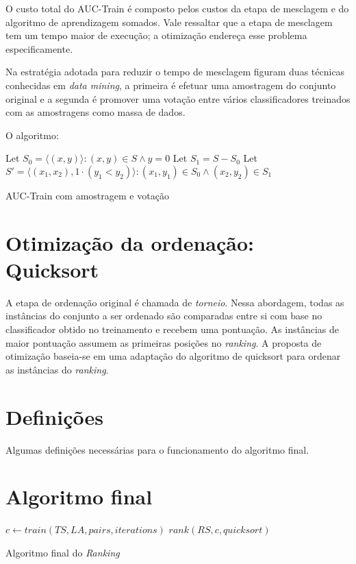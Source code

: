 O custo total do AUC-Train é composto pelos custos da etapa de mesclagem e do algoritmo de aprendizagem somados. Vale ressaltar que a etapa de mesclagem tem um tempo maior de execução; a otimização endereça esse problema especificamente.

Na estratégia adotada para reduzir o tempo de mesclagem figuram duas técnicas conhecidas em \emph{data mining}, a primeira é efetuar uma amostragem do conjunto original e a segunda é promover uma votação entre vários classificadores treinados com as amostragens como massa de dados.

O algoritmo:

\begin{algorithm}
\begin{algorithmic}

\STATE Let $S_0 = {\langle (x, y) \rangle: (x, y) \in S \wedge y = 0}$
\STATE Let $S_1 = S - S_0$
\STATE Let $S' = {{\langle (x_1, x_2), 1 \cdot (y_1 < y_2) \rangle : (x_1, y_1) \in S_0 \wedge (x_2, y_2) \in S_1}}$
\ENDFOR
\caption{AUC-Train com amostragem e votação}
\label{alg:auc-train-amostragem-votacao}

\end{algorithmic}
\end{algorithm}

\section{Otimização da ordenação: Quicksort}
A etapa de ordenação original é chamada de \emph{torneio}. Nessa abordagem, todas as instâncias do conjunto a ser ordenado são comparadas entre si com base no classificador obtido no treinamento e recebem uma pontuação. As instâncias de maior pontuação assumem as primeiras posições no \emph{ranking}. A proposta de otimização baseia-se em uma adaptação do algoritmo de quicksort para ordenar as instâncias do \emph{ranking}.

\section{Definições}
Algumas definições necessárias para o funcionamento do algoritmo final.

\section{Algoritmo final}

\begin{algorithm}
\begin{algorithmic}

\STATE $c \gets train(TS, LA, pairs, iterations)$
\STATE $rank(RS, c, quicksort)$

\caption{Algoritmo final do \emph{Ranking}}
\label{alg:ranking}

\end{algorithmic}
\end{algorithm}
